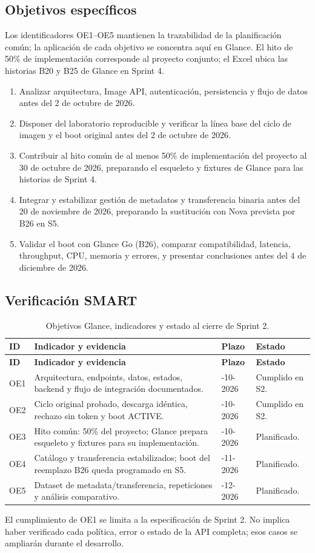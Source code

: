 \documentclass[12pt,a4paper]{article}
\newcommand{\reporttable}[4]{\begingroup\small\setlength{\LTpre}{8pt}\setlength{\LTpost}{8pt}\setlength{\tabcolsep}{4pt}\renewcommand{\arraystretch}{1.15}
\begin{longtable}{#2}\caption{#1}\\\toprule #3\\\midrule\endfirsthead
\toprule #3\\\midrule\endhead\bottomrule\endfoot #4\end{longtable}\endgroup}
\begin{document}
\subsection{Objetivos específicos}
Los identificadores OE1--OE5 mantienen la trazabilidad de la planificación común; la aplicación de cada objetivo se concentra aquí en Glance. El hito de 50\% de implementación corresponde al proyecto conjunto; el Excel ubica las historias B20 y B25 de Glance en Sprint 4.
\begin{enumerate}[label=\textbf{OE\arabic*.}]
\item Analizar arquitectura, Image API, autenticación, persistencia y flujo de datos antes del 2 de octubre de 2026.
\item Disponer del laboratorio reproducible y verificar la línea base del ciclo de imagen y el boot original antes del 2 de octubre de 2026.
\item Contribuir al hito común de al menos 50\% de implementación del proyecto al 30 de octubre de 2026, preparando el esqueleto y fixtures de Glance para las historias de Sprint 4.
\item Integrar y estabilizar gestión de metadatos y transferencia binaria antes del 20 de noviembre de 2026, preparando la sustitución con Nova prevista por B26 en S5.
\item Validar el boot con Glance Go (B26), comparar compatibilidad, latencia, throughput, CPU, memoria y errores, y presentar conclusiones antes del 4 de diciembre de 2026.
\end{enumerate}

\subsection{Verificación SMART}
\reporttable{Objetivos Glance, indicadores y estado al cierre de Sprint 2.}{>{\raggedright\arraybackslash}p{1cm}>{\raggedright\arraybackslash}p{8cm}>{\raggedright\arraybackslash}p{2.5cm}>{\raggedright\arraybackslash}p{2.8cm}}{\textbf{ID}&\textbf{Indicador y evidencia}&\textbf{Plazo}&\textbf{Estado}}{
OE1&Arquitectura, endpoints, datos, estados, backend y flujo de integración documentados.&02-10-2026&Cumplido en S2.\\*
OE2&Ciclo original probado, descarga idéntica, rechazo sin token y boot ACTIVE.&02-10-2026&Cumplido en S2.\\*
OE3&Hito común: 50\% del proyecto; Glance prepara esqueleto y fixtures para su implementación.&30-10-2026&Planificado.\\*
OE4&Catálogo y transferencia estabilizados; boot del reemplazo B26 queda programado en S5.&20-11-2026&Planificado.\\*
OE5&Dataset de metadata/transferencia, repeticiones y análisis comparativo.&04-12-2026&Planificado.\\}
El cumplimiento de OE1 se limita a la especificación de Sprint 2. No implica haber verificado cada política, error o estado de la API completa; esos casos se ampliarán durante el desarrollo.
\end{document}
